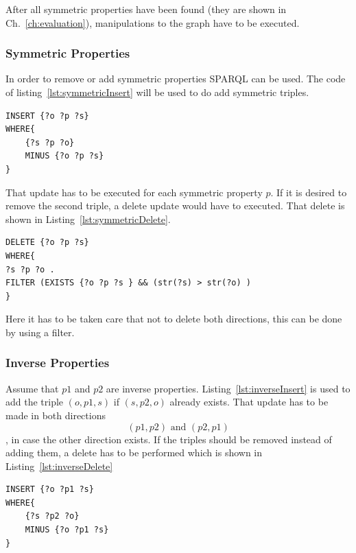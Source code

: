 
After all symmetric properties have been found (they are shown in Ch.~\ref{ch:evaluation}), manipulations to the graph have to be executed.

\subsubsection{Symmetric Properties}

In order to remove or add symmetric properties SPARQL can be used. The code of listing~\ref{lst:symmetricInsert} will be used to do add symmetric triples.

\begin{lstlisting}[captionpos=b, caption=SPARQL update for adding triples with the symmetric property p., label=lst:symmetricInsert,
basicstyle=\ttfamily,frame=single,float=hbt,]
INSERT {?o ?p ?s}
WHERE{
	{?s ?p ?o}
	MINUS {?o ?p ?s}
}
\end{lstlisting}

That update has to be executed for each symmetric property $p$. If it is desired to remove the second triple, a delete update would have to executed. That delete is shown in Listing~\ref{lst:symmetricDelete}.


\begin{lstlisting}[captionpos=b, caption=SPARQL update for removing triples with the symmetric property p., label=lst:symmetricDelete,
basicstyle=\ttfamily,frame=single,float=hbt,]
DELETE {?o ?p ?s}
WHERE{
?s ?p ?o .
FILTER (EXISTS {?o ?p ?s } && (str(?s) > str(?o) )
}
\end{lstlisting}

Here it has to be taken care that not to delete both directions, this can be done by using a filter.

\subsubsection{Inverse Properties}

Assume that $ p1 $ and $ p2 $ are inverse properties. Listing~\ref{lst:inverseInsert} is used to add the triple $(o,p1,s)$ if $(s,p2,o)$ already exists. That update has to be made in both directions  
\[
(p1,p2) \text{ and } (p2,p1)
\]
, in case the other direction exists. If the triples should be removed instead of adding them, a delete has to be performed which is shown in Listing~\ref{lst:inverseDelete}

\begin{lstlisting}[captionpos=b, caption=SPARQL update for adding triples with the inverse properties p1 and p2., label=lst:inverseInsert,
basicstyle=\ttfamily,frame=single,float=hbt,]
INSERT {?o ?p1 ?s}
WHERE{
	{?s ?p2 ?o}
	MINUS {?o ?p1 ?s}
}
\end{lstlisting}



